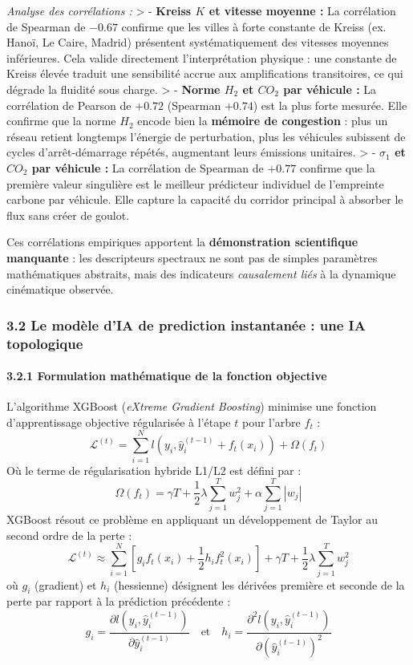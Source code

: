 \documentclass[10pt, a4paper]{article}
\begin{document}
\emph{Analyse des corrélations :} \textgreater{} - \textbf{Kreiss \(K\)
et vitesse moyenne :} La corrélation de Spearman de \(-0.67\) confirme
que les villes à forte constante de Kreiss (ex. Hanoï, Le Caire, Madrid)
présentent systématiquement des vitesses moyennes inférieures. Cela
valide directement l'interprétation physique : une constante de Kreiss
élevée traduit une sensibilité accrue aux amplifications transitoires,
ce qui dégrade la fluidité sous charge. \textgreater{} - \textbf{Norme
\(H_2\) et \(CO_2\) par véhicule :} La corrélation de Pearson de
\(+0.72\) (Spearman \(+0.74\)) est la plus forte mesurée. Elle confirme
que la norme \(H_2\) encode bien la \textbf{mémoire de congestion} :
plus un réseau retient longtemps l'énergie de perturbation, plus les
véhicules subissent de cycles d'arrêt-démarrage répétés, augmentant
leurs émissions unitaires. \textgreater{} - \textbf{\(\sigma_1\) et
\(CO_2\) par véhicule :} La corrélation de Spearman de \(+0.77\)
confirme que la première valeur singulière est le meilleur prédicteur
individuel de l'empreinte carbone par véhicule. Elle capture la capacité
du corridor principal à absorber le flux sans créer de goulot.

Ces corrélations empiriques apportent la \textbf{démonstration
scientifique manquante} : les descripteurs spectraux ne sont pas de
simples paramètres mathématiques abstraits, mais des indicateurs
\emph{causalement liés} à la dynamique cinématique observée.

\subsubsection{3.2 Le modèle d'IA de prediction instantanée : une IA
topologique}\label{le-moduxe8le-dia-de-prediction-instantanuxe9e-une-ia-topologique}

\paragraph{3.2.1 Formulation mathématique de la fonction
objective}\label{formulation-mathuxe9matique-de-la-fonction-objective}

L'algorithme XGBoost (\emph{eXtreme Gradient Boosting}) minimise une
fonction d'apprentissage objective régularisée à l'étape \(t\) pour
l'arbre \(f_t\) :
\[\mathcal{L}^{(t)} = \sum_{i=1}^N l\left(y_i, \hat{y}_i^{(t-1)} + f_t(x_i)\right) + \Omega(f_t)\]
Où le terme de régularisation hybride L1/L2 est défini par :
\[\Omega(f_t) = \gamma T + \frac{1}{2} \lambda \sum_{j=1}^T w_j^2 + \alpha \sum_{j=1}^T |w_j|\]
XGBoost résout ce problème en appliquant un développement de Taylor au
second ordre de la perte :
\[\mathcal{L}^{(t)} \approx \sum_{i=1}^N \left[ g_i f_t(x_i) + \frac{1}{2} h_i f_t^2(x_i) \right] + \gamma T + \frac{1}{2} \lambda \sum_{j=1}^T w_j^2\]
où \(g_i\) (gradient) et \(h_i\) (hessienne) désignent les dérivées
première et seconde de la perte par rapport à la prédiction précédente :
\[g_i = \frac{\partial l\left(y_i, \hat{y}_i^{(t-1)}\right)}{\partial \hat{y}_i^{(t-1)}} \quad \text{et} \quad h_i = \frac{\partial^2 l\left(y_i, \hat{y}_i^{(t-1)}\right)}{\partial \left(\hat{y}_i^{(t-1)}\right)^2}\]
\end{document}
